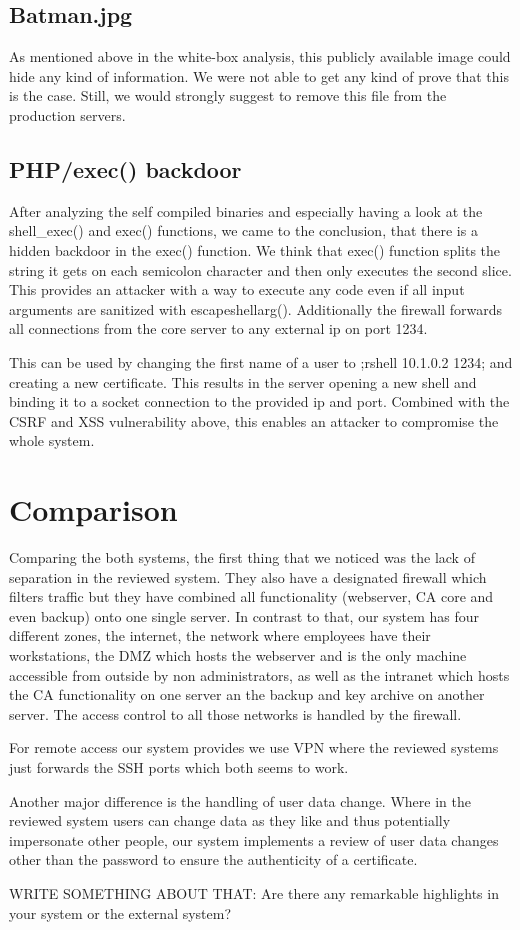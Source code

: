 \documentclass{article}
\begin{document}
\subsection{Batman.jpg}
As mentioned above in the white-box analysis, this publicly available image could hide any kind of information. We were not able to get any kind of prove that this is the case. Still, we would strongly suggest to remove this file from the production servers.

\subsection{PHP/exec() backdoor}
After analyzing the self compiled binaries and especially having a look at the shell\_exec() and exec() functions, we came to the conclusion, that there is a hidden backdoor in the exec() function. We think that exec() function splits the string it gets on each semicolon character and then only executes the second slice. This provides an attacker with a way to execute any code even if all input arguments are sanitized with escapeshellarg(). Additionally the firewall forwards all connections from the core server to any external ip on port 1234.

This can be used by changing the first name of a user to ;rshell 10.1.0.2 1234; and creating a new certificate. This results in the server opening a new shell and binding it to a socket connection to the provided ip and port. Combined with the CSRF and XSS vulnerability above, this enables an attacker to compromise the whole system.

\section{Comparison}
Comparing the both systems, the first thing that we noticed was the lack of separation in the reviewed system. They also have a designated firewall which filters traffic but they have combined all functionality (webserver, CA core and even backup) onto one single server. In contrast to that, our system has four different zones, the internet, the network where employees have their workstations, the DMZ which hosts the webserver and is the only machine accessible from outside by non administrators, as well as the intranet which hosts the CA functionality on one server an the backup and key archive on another server. The access control to all those networks is handled by the firewall.

For remote access our system provides we use VPN where the reviewed systems just forwards the SSH ports which both seems to work.

Another major difference is the handling of user data change. Where in the reviewed system users can change data as they like and thus potentially impersonate other people, our system implements a review of user data changes other than the password to ensure the authenticity of a certificate.

WRITE SOMETHING ABOUT THAT: Are there any remarkable highlights in your system or the external system?
\end{document}
